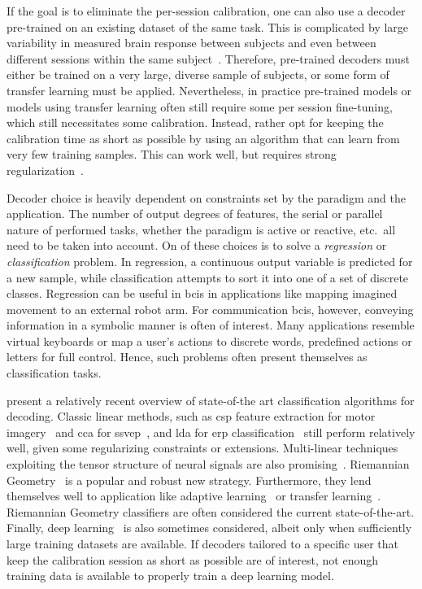 If the goal is to eliminate the per-session calibration, one can also use a
decoder pre-trained on an existing dataset of the same task.
This is complicated by large variability in measured brain response between subjects
and even between different sessions within the same
subject~\cite{Guger2009,Saha2020}.
Therefore, pre-trained decoders must either be trained on a very large, diverse
sample of subjects, or some form of transfer learning must be applied.
Nevertheless, in practice pre-trained models or models using transfer learning often still
require some per session fine-tuning, which still necessitates some
calibration.
Instead, rather opt for keeping the calibration time as short as possible by using
an algorithm that can learn from very few training samples.
This can work well, but requires strong regularization~\cite{VanDenKerchove2022}.

Decoder choice is heavily dependent on constraints set by the paradigm and the
application.
The number of output degrees of features, the serial or parallel nature of
performed tasks, whether the paradigm is active or reactive, etc.\ all need to
be taken into account.
On of these choices is to solve a \emph{regression} or \emph{classification}
problem.
In regression, a continuous output variable is predicted for a new sample,
while classification attempts to sort it into one of a set of discrete classes.
Regression can be useful in \acp{bci} in applications like mapping imagined
movement to an external robot arm.
For communication \acp{bci}, however, conveying information in a symbolic
manner is often of interest.
Many applications resemble virtual keyboards or map a user's actions to
discrete words, predefined actions or letters for full control.
Hence, such problems often present themselves as classification tasks.

\textcite{Lotte2018, Xu2021} present a relatively recent overview of state-of-the art
classification algorithms for decoding.
Classic linear methods, such as \ac{csp} feature extraction for
motor imagery~\cite{Park2017} and \ac{cca} for \ac{ssvep}~\cite{Nakanishi2017},
and \ac{lda} for \ac{erp} classification~\cite{Sosulski2022} still perform
relatively well, given some regularizing constraints or extensions.
Multi-linear techniques exploiting the tensor structure of neural signals are
also promising~\cite{Lotte2018}.
Riemannian Geometry~\cite{Barachant2014} is a popular and robust new strategy.
Furthermore, they lend themselves well to application like adaptive
learning~\cite{Benaroch2021} or transfer learning~\cite{Zanini2017}.
Riemannian Geometry classifiers are often considered the current
state-of-the-art.
Finally, deep learning~\cite{Bhuvaneshwari2021} is also sometimes considered,
albeit only when sufficiently large training datasets are available.
If decoders tailored to a specific user that keep the calibration session as
short as possible are of interest, not enough training data is available to
properly train a deep learning model.

